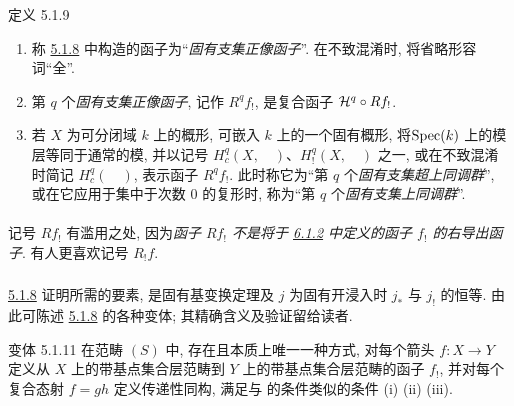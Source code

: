 \begin{enonce*}{定义 5.1.9}
\begin{enumerate}
\renewcommand{\theenumi}{\roman{enumi}}
\renewcommand{\labelenumi}{(\theenumi)}
\item 称 \hyperref[XVII.thm5.1.8]{5.1.8} 中构造的函子为“\emph{固有支集正像函子}”. 在不致混淆时, 将省略形容词“全”.

\item 第 $q$ 个\emph{固有支集正像函子}, 记作 $R^{q}f_{!}$, 是复合函子 ${\mathcal H}^{q}\circ Rf_{!}$.

\item 若 $X$ 为可分闭域 $k$ 上的概形, 可嵌入 $k$ 上的一个固有概形, 将\pageoriginale $\operatorname{Spec} (k)$ 上的模层等同于通常的模, 并以记号 $H^{q}_c(X,\quad)$、$H^{q}_{!}(X,\quad)$ 之一, 或在不致混淆时简记 $H^{q}_c(\quad)$, 表示函子 $R^{q}f_{!}$. 此时称它为“第 $q$ 个\emph{固有支集超上同调群}”, 或在它应用于集中于次数 $0$ 的复形时, 称为“第 $q$ 个\emph{固有支集上同调群}”.
\end{enumerate}
\end{enonce*}

\setcounter{subsubsection}{9}
\setcounter{paragraph}{0}
\paragraph{}
记号 $Rf_{!}$ 有滥用之处, 因为\emph{函子 $Rf_{!}$ 不是将于 \hyperref[XVII.def6.1.2]{6.1.2} 中定义的函子 $f_{!}$ 的右导出函子}. 有人更喜欢记号 $R_{!}f$.

\subsubsection{}
\hyperref[XVII.thm5.1.8]{5.1.8} 证明所需的要素, 是固有基变换定理及 $j$ 为固有开浸入时 $j_{\ast}$ 与 $j_{!}$ 的恒等. 由此可陈述 \hyperref[XVII.thm5.1.8]{5.1.8} 的各种变体; 其精确含义及验证留给读者.

\begin{enonce*}{变体 5.1.11}
在范畴 $(S)$ 中, 存在且本质上唯一一种方式, 对每个箭头 $f:X\rightarrow Y$ 定义从 $X$ 上的带基点集合层范畴到 $Y$ 上的带基点集合层范畴的函子 $f_{!}$, 并对每个复合态射 $f=gh$ 定义传递性同构, 满足与  的条件类似的条件 {\rm (i)\sisi{,}{} (ii) (iii)}.
\end{enonce*}

